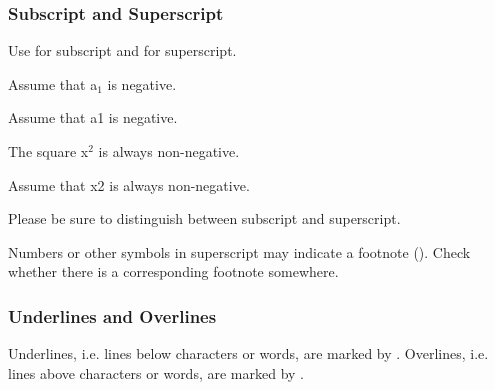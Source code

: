 
\subsubsection{Subscript and Superscript}
\label{section subscript and superscript}

\begin{mainrule}
Use  for subscript and  for superscript.

\end{mainrule}

\begin{example}[ 1: \, subscript]

\vspace{-4mm}
Assume that a$_1$ is negative.
\begin{typeLatin}
Assume that a1 is negative.
\end{typeLatin}
\end{example}

\begin{example}[ 2: \, superscript]

\vspace{-4mm}
The square x$^2$ is always non-negative.
\begin{typeLatin}
Assume that x2 is always non-negative.
\end{typeLatin}
\end{example}

\begin{note}
Please be sure to distinguish between subscript and superscript.
\end{note}

\begin{note}
Numbers or other symbols in superscript may indicate a footnote (). Check whether there is a corresponding footnote somewhere.
\end{note}

\subsubsection{Underlines and Overlines}
\label{section underlines and overlines}

\begin{mainrule}
Underlines, i.e. lines below characters or words, are marked by .
Overlines, i.e. lines above characters or words, are marked by .
\end{mainrule}

